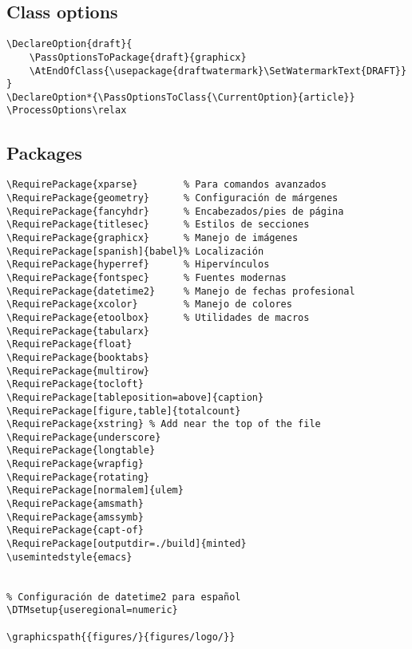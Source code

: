 \documentclass{reporti}
\begin{document}
\subsection{Class options}
\label{sec:orgbe6a759}
\begin{verbatim}
\DeclareOption{draft}{
    \PassOptionsToPackage{draft}{graphicx}
    \AtEndOfClass{\usepackage{draftwatermark}\SetWatermarkText{DRAFT}}
}
\DeclareOption*{\PassOptionsToClass{\CurrentOption}{article}}
\ProcessOptions\relax
\end{verbatim}

\subsection{Packages}
\label{sec:org9596467}
\begin{verbatim}
\RequirePackage{xparse}        % Para comandos avanzados
\RequirePackage{geometry}      % Configuración de márgenes
\RequirePackage{fancyhdr}      % Encabezados/pies de página
\RequirePackage{titlesec}      % Estilos de secciones
\RequirePackage{graphicx}      % Manejo de imágenes
\RequirePackage[spanish]{babel}% Localización
\RequirePackage{hyperref}      % Hipervínculos
\RequirePackage{fontspec}      % Fuentes modernas
\RequirePackage{datetime2}     % Manejo de fechas profesional
\RequirePackage{xcolor}        % Manejo de colores
\RequirePackage{etoolbox}      % Utilidades de macros
\RequirePackage{tabularx}
\RequirePackage{float}
\RequirePackage{booktabs}
\RequirePackage{multirow}
\RequirePackage{tocloft}
\RequirePackage[tableposition=above]{caption}
\RequirePackage[figure,table]{totalcount}
\RequirePackage{xstring} % Add near the top of the file
\RequirePackage{underscore}
\RequirePackage{longtable}
\RequirePackage{wrapfig}
\RequirePackage{rotating}
\RequirePackage[normalem]{ulem}
\RequirePackage{amsmath}
\RequirePackage{amssymb}
\RequirePackage{capt-of}
\RequirePackage[outputdir=./build]{minted}
\usemintedstyle{emacs}


% Configuración de datetime2 para español
\DTMsetup{useregional=numeric}

\graphicspath{{figures/}{figures/logo/}}
\end{verbatim}
\end{document}
